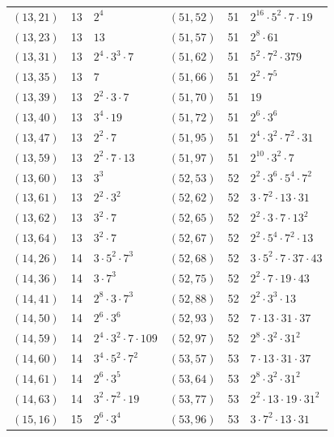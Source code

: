 \documentclass[11pt]{article}
\begin{document}
\begin{longtable}{@{}lrl@{\qquad}lrl@{}}
$(13,21)$ & 13 & $2^{4}$ & $(51,52)$ & 51 & $2^{16}\cdot 5^{2}\cdot 7\cdot 19$\\
$(13,23)$ & 13 & $13$ & $(51,57)$ & 51 & $2^{8}\cdot 61$\\
$(13,31)$ & 13 & $2^{4}\cdot 3^{3}\cdot 7$ & $(51,62)$ & 51 & $5^{2}\cdot 7^{2}\cdot 379$\\
$(13,35)$ & 13 & $7$ & $(51,66)$ & 51 & $2^{2}\cdot 7^{5}$\\
$(13,39)$ & 13 & $2^{2}\cdot 3\cdot 7$ & $(51,70)$ & 51 & $19$\\
$(13,40)$ & 13 & $3^{4}\cdot 19$ & $(51,72)$ & 51 & $2^{6}\cdot 3^{6}$\\
$(13,47)$ & 13 & $2^{2}\cdot 7$ & $(51,95)$ & 51 & $2^{4}\cdot 3^{2}\cdot 7^{2}\cdot 31$\\
$(13,59)$ & 13 & $2^{2}\cdot 7\cdot 13$ & $(51,97)$ & 51 & $2^{10}\cdot 3^{2}\cdot 7$\\
$(13,60)$ & 13 & $3^{3}$ & $(52,53)$ & 52 & $2^{2}\cdot 3^{6}\cdot 5^{4}\cdot 7^{2}$\\
$(13,61)$ & 13 & $2^{2}\cdot 3^{2}$ & $(52,62)$ & 52 & $3\cdot 7^{2}\cdot 13\cdot 31$\\
$(13,62)$ & 13 & $3^{2}\cdot 7$ & $(52,65)$ & 52 & $2^{2}\cdot 3\cdot 7\cdot 13^{2}$\\
$(13,64)$ & 13 & $3^{2}\cdot 7$ & $(52,67)$ & 52 & $2^{2}\cdot 5^{4}\cdot 7^{2}\cdot 13$\\
$(14,26)$ & 14 & $3\cdot 5^{2}\cdot 7^{3}$ & $(52,68)$ & 52 & $3\cdot 5^{2}\cdot 7\cdot 37\cdot 43$\\
$(14,36)$ & 14 & $3\cdot 7^{3}$ & $(52,75)$ & 52 & $2^{2}\cdot 7\cdot 19\cdot 43$\\
$(14,41)$ & 14 & $2^{8}\cdot 3\cdot 7^{3}$ & $(52,88)$ & 52 & $2^{2}\cdot 3^{3}\cdot 13$\\
$(14,50)$ & 14 & $2^{6}\cdot 3^{6}$ & $(52,93)$ & 52 & $7\cdot 13\cdot 31\cdot 37$\\
$(14,59)$ & 14 & $2^{4}\cdot 3^{2}\cdot 7\cdot 109$ & $(52,97)$ & 52 & $2^{8}\cdot 3^{2}\cdot 31^{2}$\\
$(14,60)$ & 14 & $3^{4}\cdot 5^{2}\cdot 7^{2}$ & $(53,57)$ & 53 & $7\cdot 13\cdot 31\cdot 37$\\
$(14,61)$ & 14 & $2^{6}\cdot 3^{5}$ & $(53,64)$ & 53 & $2^{8}\cdot 3^{2}\cdot 31^{2}$\\
$(14,63)$ & 14 & $3^{2}\cdot 7^{2}\cdot 19$ & $(53,77)$ & 53 & $2^{2}\cdot 13\cdot 19\cdot 31^{2}$\\
$(15,16)$ & 15 & $2^{6}\cdot 3^{4}$ & $(53,96)$ & 53 & $3\cdot 7^{2}\cdot 13\cdot 31$\\

\end{longtable}
\end{document}
